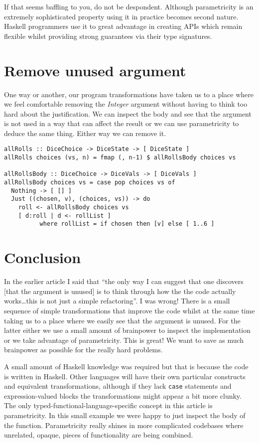 If that seems baffling to you, do not be despondent. Although parametricity is an extremely sophisticated property using it in practice becomes second nature. Haskell programmers use it to great advantage in creating APIs which remain flexible whilst providing strong guarantees via their type signatures.

\section{Remove unused argument}


One way or another, our program transformations have taken us to a place where we feel comfortable removing the \textit{Integer} argument without having to think too hard about the justification. We can inspect the body and see that the argument is not used in a way that can affect the result or we can use parametricity to deduce the same thing. Either way we can remove it.

\begin{verbatim}
allRolls :: DiceChoice -> DiceState -> [ DiceState ]
allRolls choices (vs, n) = fmap (, n-1) $ allRollsBody choices vs

allRollsBody :: DiceChoice -> DiceVals -> [ DiceVals ]
allRollsBody choices vs = case pop choices vs of
  Nothing -> [ [] ]
  Just ((chosen, v), (choices, vs)) -> do
    roll <- allRollsBody choices vs
    [ d:roll | d <- rollList ]
          where rollList = if chosen then [v] else [ 1..6 ]
\end{verbatim}


\section{Conclusion}


In the earlier article I said that ``the only way I can suggest that one discovers [that the argument is unused] is to think through how the the code actually works\ldots this is not just a simple refactoring''. I was wrong! There is a small sequence of simple transformations that improve the code whilst at the same time taking us to a place where we easily see that the argument is unused. For the latter either we use a small amount of brainpower to inspect the implementation or we take advantage of parametricity. This is great! We want to save as much brainpower as possible for the really hard problems.

A small amount of Haskell knowledge was required but that is because the code is written in Haskell. Other languages will have their own particular constructs and equivalent transformations, although if they lack \texttt{case} statements and expression-valued blocks the transformations might appear a bit more clunky. The only typed-functional-language-specific concept in this article is parametricity. In this small example we were happy to just inspect the body of the function. Parametricity really shines in more complicated codebases where unrelated, opaque, pieces of functionality are being combined.








